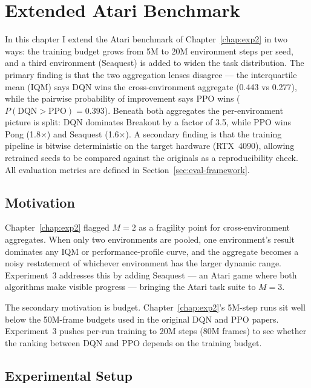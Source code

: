 
\chapter[EXP3: Extended Atari Benchmark]{Extended Atari Benchmark}
\label{chap:exp3}

In this chapter I extend the Atari benchmark of Chapter~\ref{chap:exp2} in two ways: the training budget grows from 5M to 20M environment steps per seed, and a third environment (Seaquest) is added to widen the task distribution. The primary finding is that the two aggregation lenses disagree --- the interquartile mean (IQM) says DQN wins the cross-environment aggregate (0.443 vs 0.277), while the pairwise probability of improvement says PPO wins ($P(\text{DQN}>\text{PPO})=0.393$). Beneath both aggregates the per-environment picture is split: DQN dominates Breakout by a factor of 3.5, while PPO wins Pong (1.8$\times$) and Seaquest (1.6$\times$). A secondary finding is that the training pipeline is bitwise deterministic on the target hardware (RTX~4090), allowing retrained seeds to be compared against the originals as a reproducibility check. All evaluation metrics are defined in Section~\ref{sec:eval-framework}.

\section{Motivation}
\label{sec:exp3-motivation}

Chapter~\ref{chap:exp2} flagged $M=2$ as a fragility point for cross-environment aggregates. When only two environments are pooled, one environment's result dominates any IQM or performance-profile curve, and the aggregate becomes a noisy restatement of whichever environment has the larger dynamic range. Experiment~3 addresses this by adding Seaquest --- an Atari game where both algorithms make visible progress --- bringing the Atari task suite to $M=3$.

The secondary motivation is budget. Chapter~\ref{chap:exp2}'s 5M-step runs sit well below the 50M-frame budgets used in the original DQN and PPO papers. Experiment~3 pushes per-run training to 20M steps (80M frames) to see whether the ranking between DQN and PPO depends on the training budget.

\section{Experimental Setup}
\label{sec:exp3-setup}

